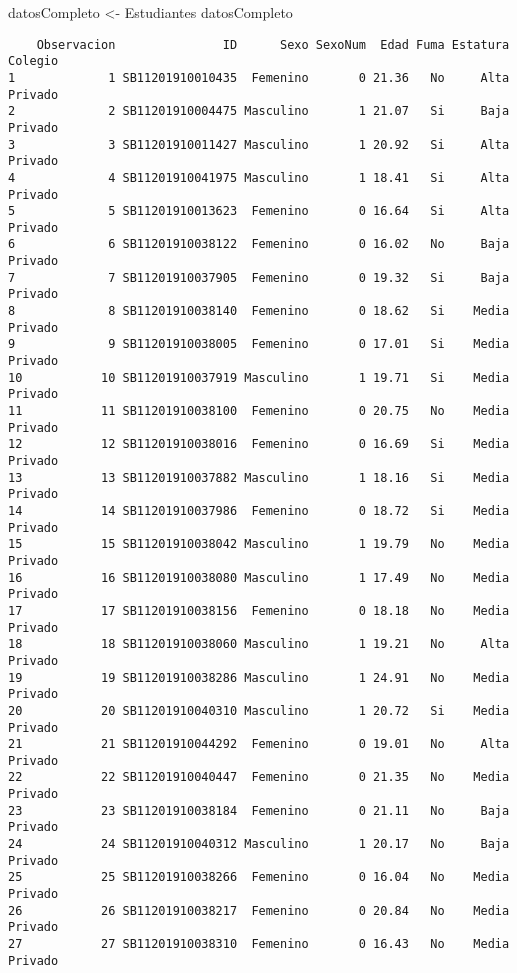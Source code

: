 \documentclass[
  letterpaper,
  DIV=11,
  numbers=noendperiod]{scrartcl}
\newenvironment{Shaded}{\begin{snugshade}}{\end{snugshade}}
\newcommand{\NormalTok}[1]{\textcolor[rgb]{0.00,0.23,0.31}{#1}}
\newcommand{\OtherTok}[1]{\textcolor[rgb]{0.00,0.23,0.31}{#1}}
\begin{document}
\begin{Shaded}
\begin{Highlighting}[]
\NormalTok{datosCompleto }\OtherTok{\textless{}{-}}\NormalTok{ Estudiantes}
\NormalTok{datosCompleto}
\end{Highlighting}
\end{Shaded}

\begin{verbatim}
    Observacion               ID      Sexo SexoNum  Edad Fuma Estatura Colegio
1             1 SB11201910010435  Femenino       0 21.36   No     Alta Privado
2             2 SB11201910004475 Masculino       1 21.07   Si     Baja Privado
3             3 SB11201910011427 Masculino       1 20.92   Si     Alta Privado
4             4 SB11201910041975 Masculino       1 18.41   Si     Alta Privado
5             5 SB11201910013623  Femenino       0 16.64   Si     Alta Privado
6             6 SB11201910038122  Femenino       0 16.02   No     Baja Privado
7             7 SB11201910037905  Femenino       0 19.32   Si     Baja Privado
8             8 SB11201910038140  Femenino       0 18.62   Si    Media Privado
9             9 SB11201910038005  Femenino       0 17.01   Si    Media Privado
10           10 SB11201910037919 Masculino       1 19.71   Si    Media Privado
11           11 SB11201910038100  Femenino       0 20.75   No    Media Privado
12           12 SB11201910038016  Femenino       0 16.69   Si    Media Privado
13           13 SB11201910037882 Masculino       1 18.16   Si    Media Privado
14           14 SB11201910037986  Femenino       0 18.72   Si    Media Privado
15           15 SB11201910038042 Masculino       1 19.79   No    Media Privado
16           16 SB11201910038080 Masculino       1 17.49   No    Media Privado
17           17 SB11201910038156  Femenino       0 18.18   No    Media Privado
18           18 SB11201910038060 Masculino       1 19.21   No     Alta Privado
19           19 SB11201910038286 Masculino       1 24.91   No    Media Privado
20           20 SB11201910040310 Masculino       1 20.72   Si    Media Privado
21           21 SB11201910044292  Femenino       0 19.01   No     Alta Privado
22           22 SB11201910040447  Femenino       0 21.35   No    Media Privado
23           23 SB11201910038184  Femenino       0 21.11   No     Baja Privado
24           24 SB11201910040312 Masculino       1 20.17   No     Baja Privado
25           25 SB11201910038266  Femenino       0 16.04   No    Media Privado
26           26 SB11201910038217  Femenino       0 20.84   No    Media Privado
27           27 SB11201910038310  Femenino       0 16.43   No    Media Privado

\end{verbatim}
\end{document}
